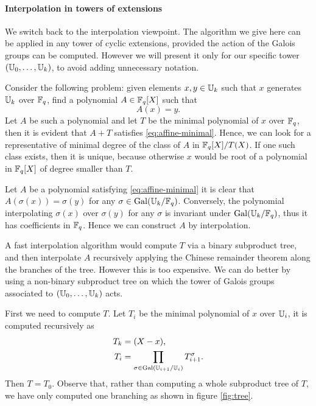 \paragraph{Interpolation in towers of extensions}
We switch back to the interpolation viewpoint. The algorithm we give
here can be applied in any tower of cyclic extensions, provided the
action of the Galois groups can be computed. However we will present
it only for our specific tower $(\mathbb{U}_0,\dots,\mathbb{U}_k)$, to avoid adding
unnecessary notation.

Consider the following problem: given elements $x,y\in\mathbb{U}_k$ such that
$x$ generates $\mathbb{U}_k$ over $\mathbb{F}_q$, find a polynomial $A\in\mathbb{F}_q[X]$ such
that
\begin{equation}
  \label{eq:affine-minimal}
  A(x) = y
  \text{.}
\end{equation}
Let $A$ be such a polynomial and let $T$ be the minimal polynomial of
$x$ over $\mathbb{F}_q$, then it is evident that $A+T$ satisfies
\eqref{eq:affine-minimal}. Hence, we can look for a representative of
minimal degree of the class of $A$ in $\mathbb{F}_q[X]/T(X)$. If one such
class exists, then it is unique, because otherwise $x$ would be root
of a polynomial in $\mathbb{F}_q[X]$ of degree smaller than $T$. 

Let $A$ be a polynomial satisfying \eqref{eq:affine-minimal} it is
clear that $A(\sigma(x)) = \sigma(y)$ for any
$\sigma\in\operatorname{Gal}(\mathbb{U}_k/\mathbb{F}_q)$. Conversely, the polynomial interpolating
$\sigma(x)$ over $\sigma(y)$ for any $\sigma$ is invariant under
$\operatorname{Gal}(\mathbb{U}_k/\mathbb{F}_q)$, thus it has coefficients in $\mathbb{F}_q$. Hence we can
construct $A$ by interpolation.

A fast interpolation algorithm would compute $T$ via a binary
subproduct tree, and then interpolate $A$ recursively applying the
Chinese remainder theorem along the branches of the tree. However this
is too expensive. We can do better by using a non-binary subproduct
tree on which the tower of Galois groups associated to
$(\mathbb{U}_0,\ldots,\mathbb{U}_k)$ acts.

First we need to compute $T$. Let $T_i$ be the minimal polynomial of
$x$ over $\mathbb{U}_i$, it is computed recursively as
\begin{align}
  T_k &= (X - x)\text{,}\\
  \label{eq:minprod}
  T_i &= \prod_{\sigma\in\operatorname{Gal}(\mathbb{U}_{i+1}/\mathbb{U}_i)}T_{i+1}^\sigma\text{.}
\end{align}
Then $T=T_0$. Observe that, rather than computing a whole subproduct
tree of $T$, we have only computed one branching as shown in figure
\ref{fig:tree}.

